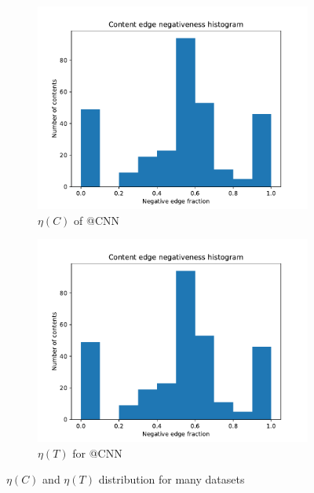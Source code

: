 \begin{figure}
\begin{center}
\begin{subfigure}[b]{0.4\textwidth}
			\includegraphics[width=\textwidth]{tex/out/foxnews2000/neg-fraction-content-hist.pdf}
			\caption{$\eta(C)$ of @CNN}
			\label{fig:CNN-content-eta}
		\end{subfigure}
		\begin{subfigure}[b]{0.4\textwidth}
			\centering
			\includegraphics[width=\textwidth]{tex/out/foxnews2000/neg-fraction-content-hist.pdf}
			\caption{$\eta(T)$ for @CNN}
			\label{fig:CNN-thread-eta}
		\end{subfigure}
		\caption{$\eta(C)$ and $\eta(T)$ distribution for many datasets}
		\label{fig:eta-content-thread}
	\end{center}
\end{figure}

